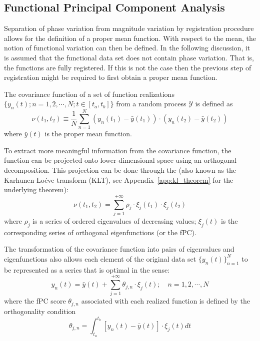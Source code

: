 \subsection{Functional Principal Component Analysis}\label{sub:sa_fpca}

Separation of phase variation from magnitude variation by registration procedure allows for the definition of a proper mean function.
With respect to the mean, the notion of functional variation can then be defined.
In the following discussion, it is assumed that the functional data set does not contain phase variation.
That is, the functions are fully registered.
If this is not the case then the previous step of registration might be required to first obtain a proper mean function.

The covariance function of a set of function realizations
$\{y_n(t);n = 1, 2, \cdots, N; t \in [t_a,t_b]\}$ from a random process $\mathcal{Y}$ is defined as
\begin{equation}
	\nu (t_1, t_2) \equiv \frac{1}{N} \sum_{n=1}^{N} (y_n(t_1) - \bar{y}(t_1)) \cdot (y_n(t_2) - \bar{y}(t_2))
\label{eq:covariance_function}
\end{equation}
where $\bar{y} (t)$ is the proper mean function.

To extract more meaningful information from the covariance function,
the function can be projected onto lower-dimensional space using an orthogonal decomposition.
This projection can be done through the  (also known as the Karhunen-Lo\'eve transform (KLT), see Appendix~\ref{app:kl_theorem} for the underlying theorem):
\begin{equation}
	\nu (t_1, t_2) = \sum_{j=1}^{+\infty} \rho_j \cdot \xi_j(t_1) \cdot \xi_j(t_2)
\label{eq:kl_transform}
\end{equation}
where $\rho_j$ is a series of ordered eigenvalues of decreasing values; 
$\xi_j(t)$ is the corresponding series of orthogonal eigenfunctions (or the fPC).

The transformation of the covariance function into pairs of eigenvalues and eigenfunctions also allows each element of the original data set $\{y_n(t)\}^N_{n=1}$ to be represented as a series that is optimal in the  sense:
\begin{equation}
  y_n(t) = \bar{y}(t) + \sum_{j=1}^{+\infty} \theta_{j,n} \cdot \xi_j (t); \quad n = 1, 2, \cdots, N
\label{eq:pod}
\end{equation}
where the fPC score $\theta_{j,n}$ associated with each realized function is defined by the orthogonality condition
\begin{equation}
  \theta_{j,n} = \int_{t_a}^{t_b} \left[y_n(t) - \bar{y}(t)\right] \cdot \xi_j (t) dt
\label{eq:pod_orthogonality}
\end{equation}

